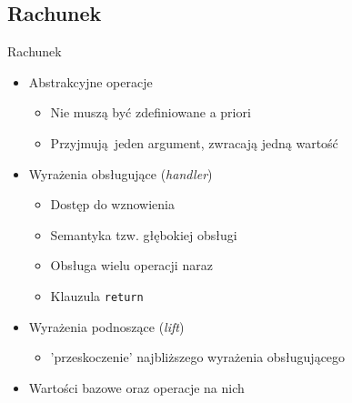 \documentclass{beamer}
\begin{document}
\subsection{Rachunek}
\begin{frame}{Rachunek}
  \begin{itemize}
    \item Abstrakcyjne operacje
    \begin{itemize}
      \item Nie muszą być zdefiniowane a priori
      \item Przyjmują jeden argument, zwracają jedną wartość
    \end{itemize}
    \item Wyrażenia obsługujące (\emph{handler})
    \begin{itemize}
      \item Dostęp do wznowienia
      \item Semantyka tzw. głębokiej obsługi
      \item Obsługa wielu operacji naraz
      \item Klauzula \texttt{return}
    \end{itemize}
    \item Wyrażenia podnoszące (\emph{lift})
    \begin{itemize}
      \item 'przeskoczenie' najbliższego wyrażenia obsługującego
    \end{itemize}
    \item Wartości bazowe oraz operacje na nich
  \end{itemize}
\end{frame}


\end{document}
